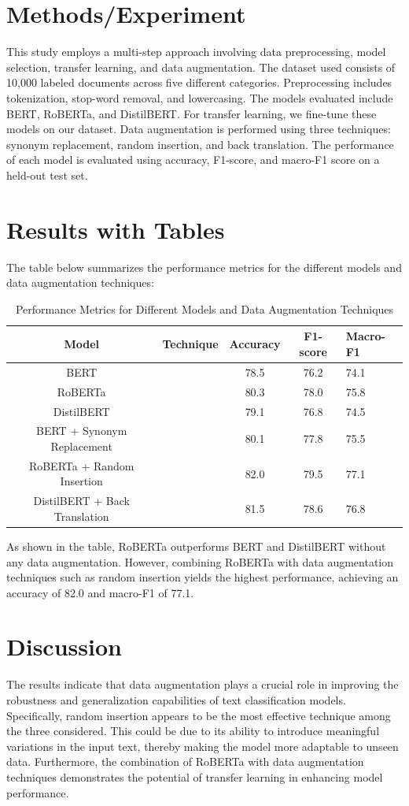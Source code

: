 \documentclass{article}
\begin{document}
\section{Methods/Experiment}
This study employs a multi-step approach involving data preprocessing, model selection, transfer learning, and data augmentation. The dataset used consists of 10,000 labeled documents across five different categories. Preprocessing includes tokenization, stop-word removal, and lowercasing. The models evaluated include BERT, RoBERTa, and DistilBERT. For transfer learning, we fine-tune these models on our dataset. Data augmentation is performed using three techniques: synonym replacement, random insertion, and back translation. The performance of each model is evaluated using accuracy, F1-score, and macro-F1 score on a held-out test set.

\section{Results with Tables}
The table below summarizes the performance metrics for the different models and data augmentation techniques:

\begin{table}[htbp]
\centering
\begin{tabular}{|c|c|c|c|}
\hline
Model & Technique & Accuracy & F1-score & Macro-F1 \\
\hline
BERT & & 78.5 & 76.2 & 74.1 \\
RoBERTa & & 80.3 & 78.0 & 75.8 \\
DistilBERT & & 79.1 & 76.8 & 74.5 \\
BERT + Synonym Replacement & & 80.1 & 77.8 & 75.5 \\
RoBERTa + Random Insertion & & 82.0 & 79.5 & 77.1 \\
DistilBERT + Back Translation & & 81.5 & 78.6 & 76.8 \\
\hline
\end{tabular}
\caption{Performance Metrics for Different Models and Data Augmentation Techniques}
\label{tab:performance_metrics}
\end{table}

As shown in the table, RoBERTa outperforms BERT and DistilBERT without any data augmentation. However, combining RoBERTa with data augmentation techniques such as random insertion yields the highest performance, achieving an accuracy of 82.0 and macro-F1 of 77.1.

\section{Discussion}
The results indicate that data augmentation plays a crucial role in improving the robustness and generalization capabilities of text classification models. Specifically, random insertion appears to be the most effective technique among the three considered. This could be due to its ability to introduce meaningful variations in the input text, thereby making the model more adaptable to unseen data. Furthermore, the combination of RoBERTa with data augmentation techniques demonstrates the potential of transfer learning in enhancing model performance.
\end{document}

